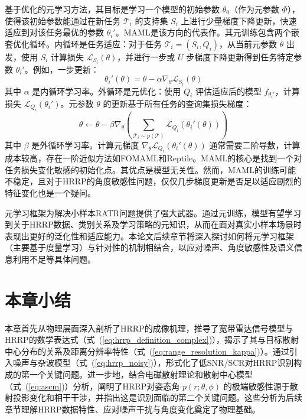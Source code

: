基于优化的元学习方法，其目标是学习一个模型的初始参数 $\theta_0$（作为元参数 $\Phi$），使得该初始参数能通过在新任务 $\mathcal{T}_i$ 的支持集 $S_i$ 上进行少量梯度下降更新，快速适应到对该任务最优的参数 $\theta_i'$。MAML是该方向的代表作。其元训练包含两个嵌套优化循环。内循环是任务适应：对于任务 $\mathcal{T}_i=(S_i, Q_i)$，从当前元参数 $\theta$ 出发，使用 $S_i$ 计算损失 $\mathcal{L}_{S_i}(\theta)$，并进行一步或 $U$ 步梯度下降更新得到任务特定参数 $\theta_i'$。例如，一步更新：
\begin{equation}
    \theta_i'(\theta) = \theta - \alpha \nabla_\theta \mathcal{L}_{S_i}(\theta)
    \label{eq:maml_inner_update}
\end{equation}
其中 $\alpha$ 是内循环学习率。外循环是元优化：使用 $Q_i$ 评估适应后的模型 $f_{\theta_i'}$，计算损失 $\mathcal{L}_{Q_i}(\theta_i')$。元参数 $\theta$ 的更新基于所有任务的查询集损失梯度：
\begin{equation}
    \theta \leftarrow \theta - \beta \nabla_\theta \left( \sum_{\mathcal{T}_i \sim p(\mathcal{T})} \mathcal{L}_{Q_i}(\theta_i'(\theta)) \right)
    \label{eq:maml_outer_update}
\end{equation}
其中 $\beta$ 是外循环学习率。计算元梯度 $\nabla_\theta \mathcal{L}_{Q_i}(\theta_i'(\theta))$ 通常需要二阶导数，计算成本较高，存在一阶近似方法如FOMAML和Reptile。MAML的核心是找到一个对任务损失变化敏感的初始化点。其优点是模型无关性。然而，MAML的训练可能不稳定，且对于HRRP的角度敏感性问题，仅仅几步梯度更新是否足以适应剧烈的特征变化也是一个疑问。


元学习框架为解决小样本RATR问题提供了强大武器。通过元训练，模型有望学习到关于HRRP数据、类别关系及学习策略的元知识，从而在面对真实小样本场景时表现出更好的泛化性和适应能力。本论文后续章节将深入探讨如何将元学习框架（主要基于度量学习）与针对性的机制相结合，以应对噪声、角度敏感性及语义信息利用不足等具体问题。

\section{本章小结}
\label{sec:theory_summary}
本章首先从物理层面深入剖析了HRRP的成像机理，推导了宽带雷达信号模型与HRRP的数学表达式（式~(\ref{eq:hrrp_definition_complex})），揭示了其与目标散射中心分布的关系及距离分辨率特性（式~(\ref{eq:range_resolution_kappa})）。通过引入噪声与杂波模型（式~(\ref{eq:hrrp_noisy})），形式化了低SNR/SCR对HRRP识别构成的第一个关键问题。进一步地，结合电磁散射理论和散射中心模型（式~(\ref{eq:ascm})）分析，阐明了HRRP对姿态角 $p(r; \theta, \phi)$ 的极端敏感性源于散射投影变化和相干干涉，并指出这是识别面临的第二个关键问题。这些分析为后续章节理解HRRP数据特性、应对噪声干扰与角度变化奠定了物理基础。

